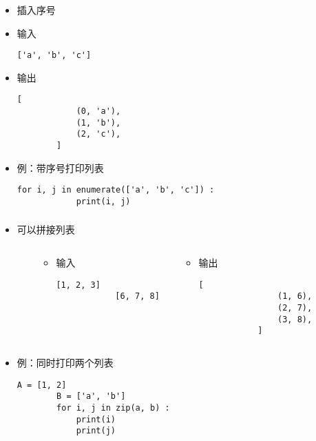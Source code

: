 \begin{CJK}{UTF8}{gbsn}
\begin{frame} [fragile]
	\frametitle{}
	\begin{itemize}
	\item {}插入序号
	\item 输入
		\begin{lstlisting}[style=pythonstyle, gobble=8, texcl]
		['a', 'b', 'c']
		\end{lstlisting}
	\item 输出
		\begin{lstlisting}[style=pythonstyle, gobble=8, texcl]
		[
			(0, 'a'), 
			(1, 'b'), 
			(2, 'c'), 
		]
		\end{lstlisting}
	\item 例：带序号打印列表
		\begin{lstlisting}[style=pythonstyle, gobble=8, texcl]
		for i, j in enumerate(['a', 'b', 'c']) :
			print(i, j)
		\end{lstlisting}
	\end{itemize}
\end{frame}

\begin{frame} [fragile]
	\frametitle{}
	\begin{itemize}
	\item {}可以拼接列表
	\begin{columns}
		\begin{column}[T]{.1\textwidth}
		\end{column}
		\begin{column}[T]{.4\textwidth}
			\begin{itemize}
			\item 输入
			\begin{lstlisting}[style=pythonstyle, gobble=12, texcl]
			[1, 2, 3]
			[6, 7, 8]
			\end{lstlisting}
			\end{itemize}
		\end{column}
		\begin{column}[T]{.4\textwidth}
			\begin{itemize}
			\item 输出
			\begin{lstlisting}[style=pythonstyle, gobble=12, texcl]
			[
				(1, 6), 
				(2, 7), 
				(3, 8), 
			]
			\end{lstlisting}
			\end{itemize}
		\end{column}
		\begin{column}[T]{.1\textwidth}
		\end{column}
	\end{columns}
	\item 例：同时打印两个列表
		\begin{lstlisting}[style=pythonstyle, gobble=8, texcl]
		A = [1, 2]
		B = ['a', 'b']
		for i, j in zip(a, b) :
			print(i)
			print(j)
		\end{lstlisting}
	\end{itemize}
\end{frame}


\end{CJK}
